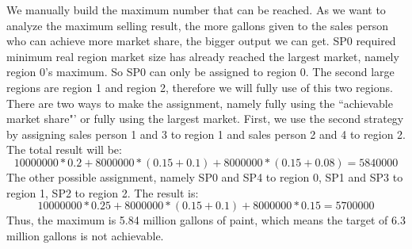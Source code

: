 \documentclass{base}
\begin{document}
We manually build the maximum number that can be reached.
As we want to analyze the maximum selling result, the more gallons given to the sales person who can achieve more market share, the bigger output we can get. SP0 required minimum real region market size has already reached the largest market, namely region 0's maximum. So SP0 can only be assigned to region 0. 
The second large regions are region 1 and region 2, therefore we will fully use of this two regions. There are two ways to make the assignment, namely fully using the ``achievable market share"' or fully using the largest market.
First, we use the second strategy by assigning sales person 1 and 3 to region 1 and sales person 2 and 4 to region 2. The total result will be:
\[10000000*0.2 + 8000000*(0.15+0.1) + 8000000*(0.15+0.08) = 5840000\]
The other possible assignment, namely SP0 and SP4 to region 0, SP1 and SP3 to region 1, SP2 to region 2. The result is:
\[10000000*0.25 + 8000000*(0.15+0.1) + 8000000*0.15 = 5700000\]
Thus, the maximum is 5.84 million gallons of paint, which means the target of 6.3 million gallons is not achievable.
\end{document}
